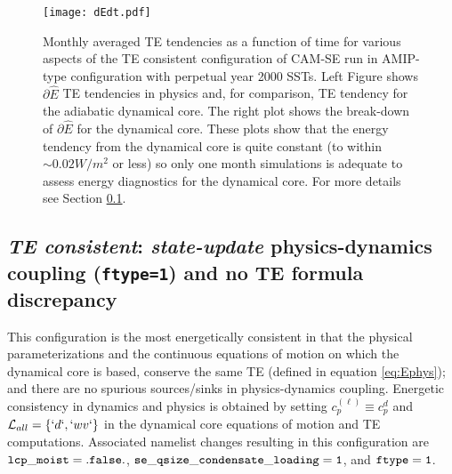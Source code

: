 \documentclass[draft,linenumbers]{agujournal}
\newcommand*{\gi}[1]{\widehat{#1}}
\begin{document}
 \begin{figure}[h]
 \centering
 \texttt{[image: dEdt.pdf]}
 \caption{Monthly averaged TE tendencies as a function of time for various aspects of the TE consistent configuration of CAM-SE run in AMIP-type configuration with perpetual year 2000 SSTs. Left Figure shows $\partial \gi{E}$ TE tendencies in physics and, for comparison, TE tendency for the adiabatic dynamical core. The right plot shows the break-down of $\partial \gi{E}$ for the dynamical core. These plots show that the energy tendency from the dynamical core is quite constant (to within $\sim 0.02W/m^2$ or less) so only one month simulations is adequate to assess energy diagnostics for the dynamical core. For more details see Section \ref{sec:consistent}.}
 \label{fig:dEdt(t)}
  \end{figure}




\subsection{{\em{TE consistent}}: {\em{state-update}} physics-dynamics coupling ({\tt{ftype=1}}) and no TE formula discrepancy}
\label{sec:consistent}
This configuration is the most energetically consistent in that the physical parameterizations and the continuous equations of motion on which the dynamical core is based, conserve the same TE (defined in equation \eqref{eq:Ephys}); and there are no spurious sources/sinks in physics-dynamics coupling. Energetic consistency in dynamics and physics is obtained by setting $c_p^{(\ell)}\equiv c_p^{d}$ and $\mathcal{L}_{all}=\left\{ `d`,`wv`\right\}$ in the dynamical core equations of motion and TE computations. Associated namelist changes resulting in this configuration are $\tt{lcp\_moist=.false.}$, $\tt{se\_qsize\_condensate\_loading=1}$, and $\tt{ftype=1}$. 
\end{document}
